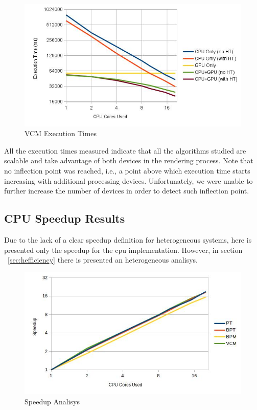 \begin{figure}[H]
\centering
\includegraphics[width=0.8\linewidth]{img/vcmTexec.jpg}
\caption{\label{img:vcmTexec} VCM Execution Times}
\end{figure}

All the execution times measured indicate that all the algorithms studied are scalable and take advantage of both devices in the rendering process. Note that no inflection point was reached, i.e., a point above which execution time starts increasing with additional processing devices. Unfortunately, we were unable to further increase the number of devices in order to detect such inflection point.

\subsection{CPU Speedup Results}

Due to the lack of a clear speedup definition for heterogeneous systems, here is presented only the speedup for the \gls{cpu} implementation. However, in section ~\ref{sec:hefficiency} there is presented an heterogeneous analisys.

\begin{figure}[H]
\centering
\includegraphics[width=0.8\linewidth]{img/speedup.jpg}
\caption{\label{img:speedup} Speedup Analisys}
\end{figure}

